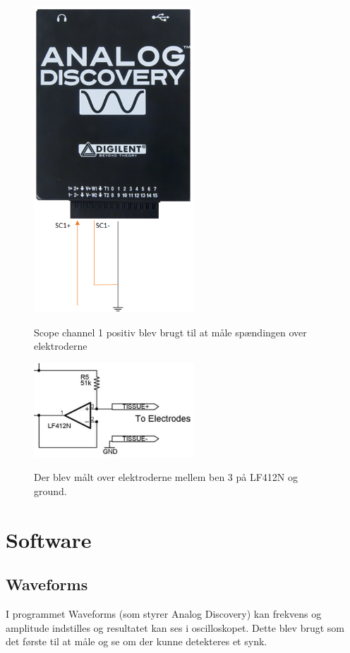 \begin{figure}[H]
\centering
{\includegraphics[width=6cm]
{Figure/adkonverter}}
\caption{Scope channel 1 positiv blev brugt til at måle spændingen over elektroderne}
\label{fig:adkonverter}
\end{figure}

\begin{figure}[H]
\centering
{\includegraphics[width=6cm]
{Figure/elektroderdia}}
\caption{Der blev målt over elektroderne mellem ben 3 på LF412N og ground.}
\label{fig:elektroderdia}
\end{figure}

\section{Software}
\subsection{Waveforms}

I programmet Waveforms (som styrer Analog Discovery) kan frekvens og amplitude indstilles og resultatet kan ses i oscilloskopet. Dette blev brugt som det første til at måle og se om der kunne detekteres et synk.

